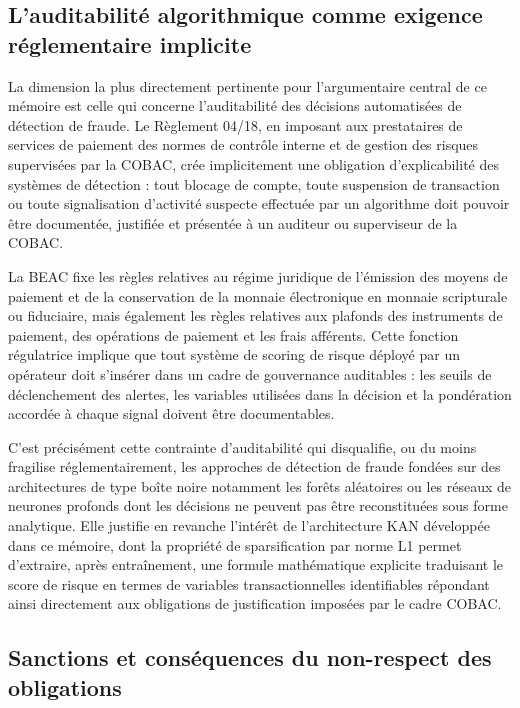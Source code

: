 \documentclass[11pt,a4paper,oneside]{report}
\theoremstyle{definition}
\theoremstyle{remark}
\begin{document}
\subsection{L'auditabilité algorithmique comme exigence réglementaire implicite}

La dimension la plus directement pertinente pour l'argumentaire central de ce mémoire est celle qui concerne l'auditabilité des décisions automatisées de détection de fraude. Le Règlement 04/18, en imposant aux prestataires de services de paiement des normes de contrôle interne et de gestion des risques supervisées par la COBAC, crée implicitement une obligation d'explicabilité des systèmes de détection : tout blocage de compte, toute suspension de transaction ou toute signalisation d'activité suspecte effectuée par un algorithme doit pouvoir être documentée, justifiée et présentée à un auditeur ou superviseur de la COBAC.

La BEAC fixe les règles relatives au régime juridique de l'émission des moyens de paiement et de la conservation de la monnaie électronique en monnaie scripturale ou fiduciaire, mais également les règles relatives aux plafonds des instruments de paiement, des opérations de paiement et les frais afférents. Cette fonction régulatrice implique que tout système de scoring de risque déployé par un opérateur doit s'insérer dans un cadre de gouvernance auditables : les seuils de déclenchement des alertes, les variables utilisées dans la décision et la pondération accordée à chaque signal doivent être documentables.

C'est précisément cette contrainte d'auditabilité qui disqualifie, ou du moins fragilise réglementairement, les approches de détection de fraude fondées sur des architectures de type boîte noire  notamment les forêts aléatoires ou les réseaux de neurones profonds dont les décisions ne peuvent pas être reconstituées sous forme analytique. Elle justifie en revanche l'intérêt de l'architecture KAN développée dans ce mémoire, dont la propriété de sparsification par norme L1 permet d'extraire, après entraînement, une formule mathématique explicite traduisant le score de risque en termes de variables transactionnelles identifiables  répondant ainsi directement aux obligations de justification imposées par le cadre COBAC.

\subsection{Sanctions et conséquences du non-respect des obligations}
\end{document}
